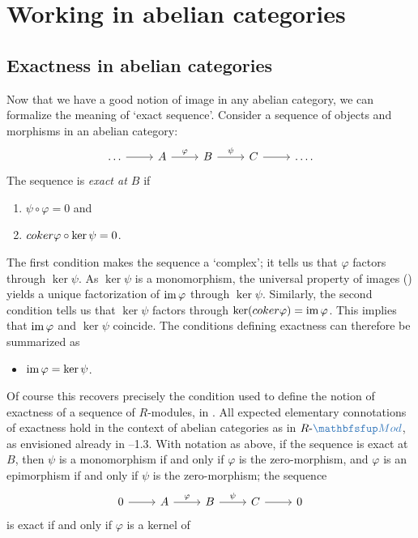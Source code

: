 \section{Working in abelian categories}
\label{sec:homol:working-in-abelian-categories}


\subsection{Exactness in abelian categories}
\label{subsec:homol:exactness-in-abelian-categories}
Now that we have a good notion of image in any abelian category, we
can formalize the meaning of `exact sequence'. Consider a sequence of
objects and morphisms in an abelian category:
\[\begin{tikzcd}
    \dots \arrow[r] & A \arrow[r, "\varphi"] & B \arrow[r, "\psi"] & C
    \arrow[r] & \dots.
  \end{tikzcd}\] The sequence is \emph{exact at $B$} if
\begin{enumerate}[label=(\arabic*)]
\item $\psi \circ \varphi = 0$ and
\item $coker\varphi \circ \ker\psi = 0$.
\end{enumerate}
The first condition makes the sequence a `complex'; it tells us that
$\varphi$ factors through $\ker\psi$. As $\ker\psi$ is a monomorphism,
the universal property of images () yields a
unique factorization of $\operatorname{im}\varphi$ through $\ker\psi$.
Similarly, the second condition tells us that $\ker\psi$ factors
through $\ker(coker\varphi) = \operatorname{im}\varphi$.  This implies that
$\operatorname{im}\varphi$ and $\ker\psi$ coincide.  The conditions defining
exactness can therefore be summarized as
\begin{itemize}
\item $\operatorname{im}\varphi = \ker\psi$.
\end{itemize}
Of course this recovers precisely the condition used to define the
notion of exactness of a sequence of $R$-modules, in
. All expected
elementary connotations of exactness hold in the context of abelian
categories as in $R\text{-}\categ{Mod}$, as envisioned already in
--1.3. With notation as
above, if the sequence is exact at $B$, then $\psi$ is a monomorphism
if and only if $\varphi$ is the zero-morphism, and $\varphi$ is an
epimorphism if and only if $\psi$ is the zero-morphism; the sequence
\[\begin{tikzcd}
    0 \arrow[r] & A \arrow[r, "\varphi"] & B \arrow[r, "\psi"] & C
    \arrow[r] & 0
  \end{tikzcd}\] is exact if and only if $\varphi$ is a kernel of
